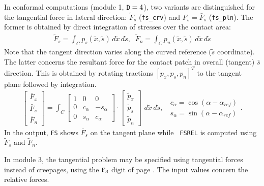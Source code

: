 \documentclass[12pt]{report}
\begin{document}
In conformal computations (module 1, ${\tt D}=4$), two variants are
distinguished for the tangential force in lateral direction: $\tilde{F}_s$
({\tt fs\_crv}) and $F_s=\bar{F}_s$ ({\tt fs\_pln}). The former is obtained
by direct integration of stresses over the contact area:
\begin{eqnarray}
  \tilde{F}_s = \int_C p_s(\tilde{x},\tilde{s}) \,d\tilde{x}\,d\tilde{s},
        \;\;
  \tilde{F}_n = \int_C p_n(\tilde{x},\tilde{s}) \,d\tilde{x}\,d\tilde{s}
\end{eqnarray}
Note that the tangent direction varies along the curved reference
($\tilde{s}$ coordinate). The latter concerns the resultant force for the
contact patch in overall (tangent) $\bar{s}$ direction. This is obtained
by rotating tractions $[p_x,p_s,p_n]^T$ to the tangent plane followed by
integration.
\begin{eqnarray}
  \left[ \begin{array}{c} \bar{F}_x \\ \bar{F}_s \\ \bar{F}_n
                \end{array} \right] = 
  \int_C \left[ \begin{array}{ccc} 1 & 0 & 0 \\
                        0 & c_\alpha & -s_\alpha \\
                        0 & s_\alpha & c_\alpha 
        \end{array} \right] \cdot
  \left[ \begin{array}{c} \tilde{p}_x \\ \tilde{p}_s \\ \tilde{p}_n
                \end{array} \right] \, \,d\tilde{x}\,d\tilde{s} , 
        \;\; \begin{array}{c}
        c_\alpha = \cos(\alpha-\alpha_{ref}) \\
        s_\alpha = \sin(\alpha-\alpha_{ref}) \end{array} .
\end{eqnarray}
In the output, {\tt FS} shows $\bar{F}_s$ on the tangent plane while {\tt
FSREL} is computed using $\tilde{F}_s$ and $\tilde{F}_n$.

In module 3, the tangential problem may be specified using tangential forces
instead of creepages, using the ${\tt F}_3$ digit of page \pageref{f3-digit}.
The input values concern the relative forces.
\end{document}
